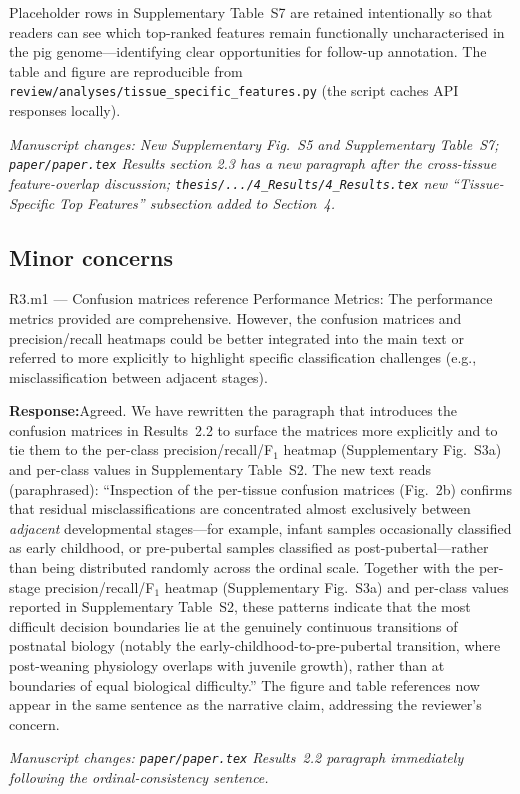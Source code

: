 \documentclass[11pt,a4paper]{article}
\newcommand{\response}[1]{%
  \par\vspace{2pt}\noindent\textbf{\textcolor{respcolor}{Response:}}\;\;#1\par\vspace{6pt}}
\newcommand{\changeloc}[1]{\par\noindent\textit{\small Manuscript changes: #1}\par}
\begin{document}
{Placeholder rows in Supplementary Table~S7 are retained intentionally so
that readers can see which top-ranked features remain functionally
uncharacterised in the pig genome---identifying clear opportunities for
follow-up annotation. The table and figure are reproducible from
\texttt{review/analyses/tissue\_specific\_features.py} (the script
caches API responses locally).}
\changeloc{New Supplementary Fig.~S5 and Supplementary Table~S7;
\texttt{paper/paper.tex} Results section 2.3 has a new paragraph after the
cross-tissue feature-overlap discussion;
\texttt{thesis/.../4\_Results/4\_Results.tex} new ``Tissue-Specific Top
Features'' subsection added to Section~4.}

\subsection*{Minor concerns}

\begin{reviewerbox}{R3.m1 — Confusion matrices reference}
Performance Metrics: The performance metrics provided are comprehensive.
However, the confusion matrices and precision/recall heatmaps could be better
integrated into the main text or referred to more explicitly to highlight
specific classification challenges (e.g., misclassification between adjacent
stages).
\end{reviewerbox}

\response{Agreed. We have rewritten the paragraph that introduces the
confusion matrices in Results~2.2 to surface the matrices more explicitly
and to tie them to the per-class precision/recall/F$_1$ heatmap
(Supplementary Fig.~S3a) and per-class values in Supplementary
Table~S2. The new text reads (paraphrased): ``Inspection of the per-tissue
confusion matrices (Fig.~2b) confirms that residual misclassifications
are concentrated almost exclusively between \emph{adjacent}
developmental stages---for example, infant samples occasionally
classified as early childhood, or pre-pubertal samples classified as
post-pubertal---rather than being distributed randomly across the
ordinal scale. Together with the per-stage precision/recall/F$_1$
heatmap (Supplementary Fig.~S3a) and per-class values reported in
Supplementary Table~S2, these patterns indicate that the most difficult
decision boundaries lie at the genuinely continuous transitions of
postnatal biology (notably the early-childhood-to-pre-pubertal
transition, where post-weaning physiology overlaps with juvenile
growth), rather than at boundaries of equal biological difficulty.''
The figure and table references now appear in the same sentence as the
narrative claim, addressing the reviewer's concern.}
\changeloc{\texttt{paper/paper.tex} Results~2.2 paragraph immediately
following the ordinal-consistency sentence.}
\end{document}

